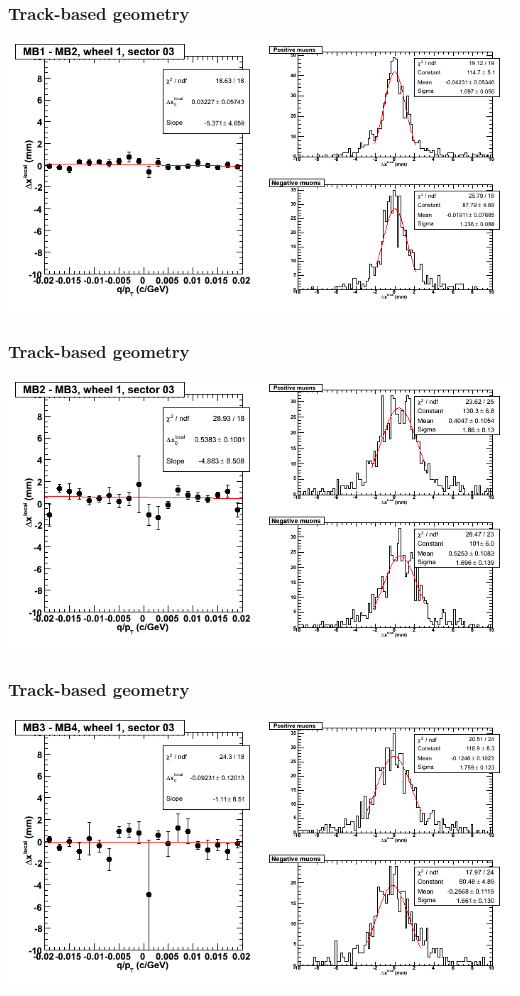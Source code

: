 \documentclass[compress]{beamer}
\begin{document}
\begin{frame}
\frametitle{Track-based geometry}
\includegraphics[width=\linewidth]{NOV4_segdiffs/dt13_resid_D_03_12.png}
\end{frame}

\begin{frame}
\frametitle{Track-based geometry}
\includegraphics[width=\linewidth]{NOV4_segdiffs/dt13_resid_D_03_23.png}
\end{frame}

\begin{frame}
\frametitle{Track-based geometry}
\includegraphics[width=\linewidth]{NOV4_segdiffs/dt13_resid_D_03_34.png}
\end{frame}
\end{document}
